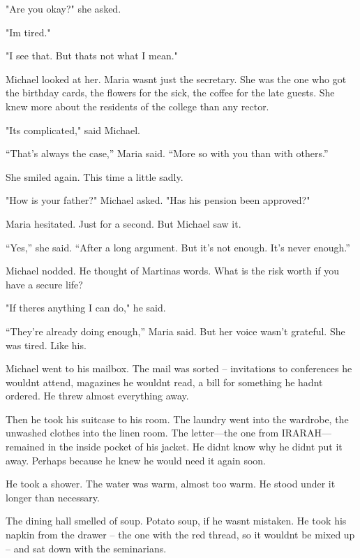 \documentclass[
]{article}
\begin{document}
"Are you okay?" she asked.

"I\textquotesingle m tired."

"I see that. But that\textquotesingle s not what I mean."

Michael looked at her. Maria wasn\textquotesingle t just the secretary. She was the one who got the birthday cards, the flowers for the sick, the coffee for the late guests. She knew more about the residents of the college than any rector.

"It\textquotesingle s complicated," said Michael.

``That's always the case,'' Maria said. ``More so with you than with others.''

She smiled again. This time a little sadly.

"How is your father?" Michael asked. "Has his pension been approved?"

Maria hesitated. Just for a second. But Michael saw it.

``Yes,'' she said. ``After a long argument. But it's not enough. It's never enough.''

Michael nodded. He thought of Martina\textquotesingle s words. What is the risk worth if you have a secure life?

"If there\textquotesingle s anything I can do," he said.

``They're already doing enough,'' Maria said. But her voice wasn't grateful. She was tired. Like his.

Michael went to his mailbox. The mail was sorted -- invitations to conferences he wouldn\textquotesingle t attend, magazines he wouldn\textquotesingle t read, a bill for something he hadn\textquotesingle t ordered. He threw almost everything away.

Then he took his suitcase to his room. The laundry went into the wardrobe, the unwashed clothes into the linen room. The letter---the one from IRARAH---remained in the inside pocket of his jacket. He didn\textquotesingle t know why he didn\textquotesingle t put it away. Perhaps because he knew he would need it again soon.

He took a shower. The water was warm, almost too warm. He stood under it longer than necessary.

The dining hall smelled of soup. Potato soup, if he wasn\textquotesingle t mistaken. He took his napkin from the drawer -- the one with the red thread, so it wouldn\textquotesingle t be mixed up -- and sat down with the seminarians.
\end{document}
